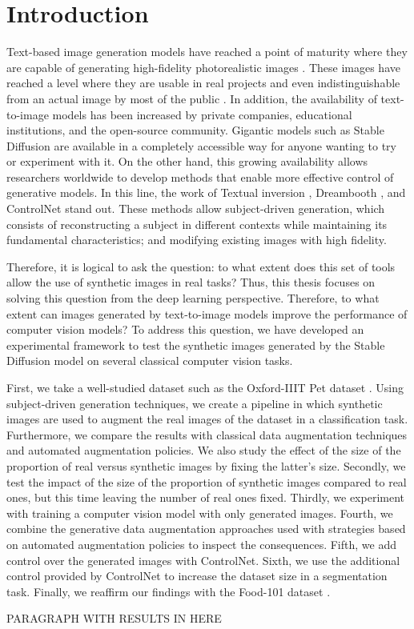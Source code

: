 \chapter{Introduction}

Text-based image generation models have reached a point of maturity where they are capable of generating high-fidelity photorealistic images \cite{ho2020denoising, dhariwal2021diffusion}. These images have reached a level where they are usable in real projects and even indistinguishable from an actual image by most of the public \cite{newyorktimesbelieve}. In addition, the availability of text-to-image models has been increased by private companies, educational institutions, and the open-source community. Gigantic models such as Stable Diffusion are available in a completely accessible way for anyone wanting to try or experiment with it. On the other hand, this growing availability allows researchers worldwide to develop methods that enable more effective control of generative models. In this line, the work of Textual inversion \cite{gal2022image}, Dreambooth \cite{ruiz2022dreambooth}, and ControlNet \cite{zhang2023adding} stand out. These methods allow subject-driven generation, which consists of reconstructing a subject in different contexts while maintaining its fundamental characteristics; and modifying existing images with high fidelity.

Therefore, it is logical to ask the question: to what extent does this set of tools allow the use of synthetic images in real tasks? Thus, this thesis focuses on solving this question from the deep learning perspective. Therefore, to what extent can images generated by text-to-image models improve the performance of computer vision models? To address this question, we have developed an experimental framework to test the synthetic images generated by the Stable Diffusion model on several classical computer vision tasks.

First, we take a well-studied dataset such as the Oxford-IIIT Pet dataset \cite{Parkhi2012CatsAD}. Using subject-driven generation techniques, we create a pipeline in which synthetic images are used to augment the real images of the dataset in a classification task. Furthermore, we compare the results with classical data augmentation techniques and automated augmentation policies. We also study the effect of the size of the proportion of real versus synthetic images by fixing the latter's size. Secondly, we test the impact of the size of the proportion of synthetic images compared to real ones, but this time leaving the number of real ones fixed. Thirdly, we experiment with training a computer vision model with only generated images. Fourth, we combine the generative data augmentation approaches used with strategies based on automated augmentation policies to inspect the consequences. Fifth, we add control over the generated images with ControlNet. Sixth, we use the additional control provided by ControlNet to increase the dataset size in a segmentation task. Finally, we reaffirm our findings with the Food-101 dataset \cite{bossard14}.

PARAGRAPH WITH RESULTS IN HERE